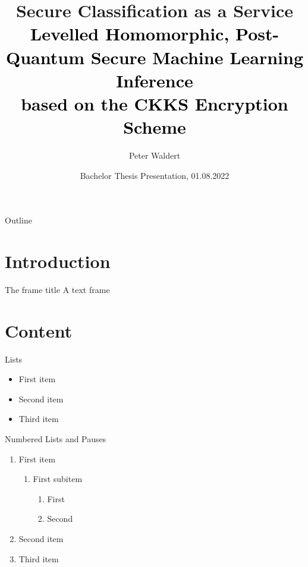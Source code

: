 \documentclass[aspectratio=169]{beamer}
\title[Secure Classification as a Service]{
  Secure Classification as a Service \\
  \small\normalfont\textcolor{black}{
    Levelled Homomorphic, Post-Quantum Secure Machine Learning Inference \\
    based on the CKKS Encryption Scheme
  }
}
\author{Peter Waldert}
\date{Bachelor Thesis Presentation, 01.08.2022}
\institute{IAIK}
\begin{document}
  \begin{frame}[plain]
    \maketitle
  \end{frame}

  \begin{frame}{Outline}
    \tableofcontents
  \end{frame}

  \section{Introduction}
  \begin{frame}{The frame title}
    A text frame
  \end{frame}

  \section{Content}
  \begin{frame}{Lists}
    \begin{itemize}
      \item First item
      \item Second item
      \item Third item
    \end{itemize}
  \end{frame}

  \begin{frame}{Numbered Lists and Pauses}
    \begin{enumerate}
      \item First item
            \begin{enumerate}
              \item First subitem
                    \begin{enumerate}
                      \item First
                      \item Second
                    \end{enumerate}
            \end{enumerate}
            \pause
      \item Second item
            \pause
      \item Third item
    \end{enumerate}
  \end{frame}
\end{document}
